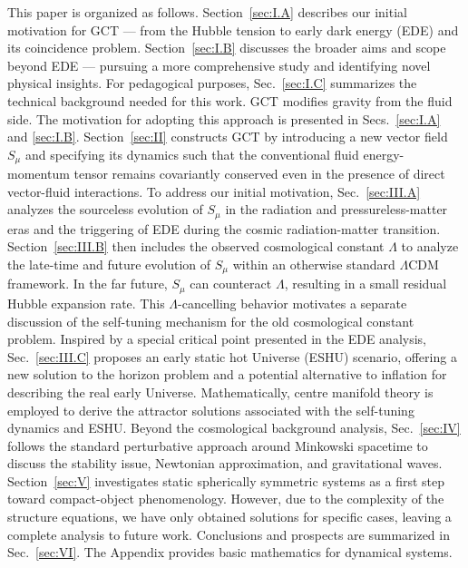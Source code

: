 \documentclass[aps,prd,twocolumn]{revtex4-2}
\begin{document}
This paper is organized as follows. Section~\ref{sec:I.A} describes our initial motivation for GCT --- from the Hubble tension to early dark energy (EDE) and its coincidence problem. Section~\ref{sec:I.B} discusses the broader aims and scope beyond EDE --- pursuing a more comprehensive study and identifying novel physical insights. For pedagogical purposes, Sec.~\ref{sec:I.C} summarizes the technical background needed for this work. GCT modifies gravity from the fluid side. The motivation for adopting this approach is presented in Secs.~\ref{sec:I.A} and \ref{sec:I.B}. Section~\ref{sec:II} constructs GCT by introducing a new vector field $S_\mu$ and specifying its dynamics such that the conventional fluid energy-momentum tensor remains covariantly conserved even in the presence of direct vector-fluid interactions. To address our initial motivation, Sec.~\ref{sec:III.A} analyzes the sourceless evolution of $S_\mu$ in the radiation and pressureless-matter eras and the triggering of EDE during the cosmic radiation-matter transition. Section~\ref{sec:III.B} then includes the observed cosmological constant $\Lambda$ to analyze the late-time and future evolution of $S_\mu$ within an otherwise standard $\Lambda$CDM framework. In the far future, $S_\mu$ can counteract $\Lambda$, resulting in a small residual Hubble expansion rate. This $\Lambda$-cancelling behavior motivates a separate discussion of the self-tuning mechanism for the old cosmological constant problem. Inspired by a special critical point presented in the EDE analysis, Sec.~\ref{sec:III.C} proposes an early static hot Universe (ESHU) scenario, offering a new solution to the horizon problem and a potential alternative to inflation for describing the real early Universe. Mathematically, centre manifold theory is employed to derive the attractor solutions associated with the self-tuning dynamics and ESHU. Beyond the cosmological background analysis, Sec.~\ref{sec:IV} follows the standard perturbative approach around Minkowski spacetime to discuss the stability issue, Newtonian approximation, and gravitational waves. Section~\ref{sec:V} investigates static spherically symmetric systems as a first step toward compact-object phenomenology. However, due to the complexity of the structure equations, we have only obtained solutions for specific cases, leaving a complete analysis to future work. Conclusions and prospects are summarized in Sec.~\ref{sec:VI}. The Appendix provides basic mathematics for dynamical systems.
\end{document}
